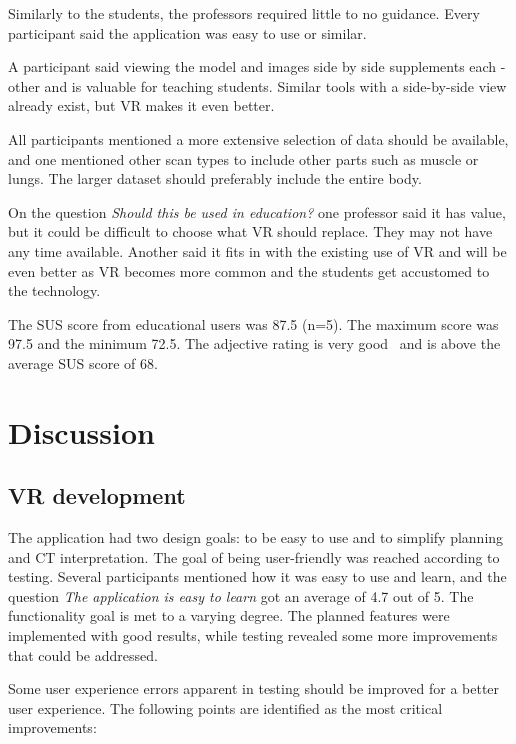 \documentclass[a4paper]{report}
\begin{document}
Similarly to the students, the professors required little to no guidance. Every participant said the application was easy to use or similar.

A participant said viewing the model and images side by side supplements each -other and is valuable for teaching students. Similar tools with a side-by-side view already exist, but VR makes it even better.

All participants mentioned a more extensive selection of data should be available, and one mentioned other scan types to include other parts such as muscle or lungs. The larger dataset should preferably include the entire body.


On the question \emph{Should this be used in education?} one professor said it has value, but it could be difficult to choose what VR should replace. They may not have any time available. Another said it fits in with the existing use of VR and will be even better as VR becomes more common and the students get accustomed to the technology.

The SUS score from educational users was 87.5 (n=5). The maximum score was 97.5 and the minimum 72.5. The adjective rating is very good~\cite{bangor_empirical_2008} and is above the average SUS score of 68.





\section{Discussion}

\subsection{VR development}

The application had two design goals: to be easy to use and to simplify planning and CT interpretation.
The goal of being user-friendly was reached according to testing. Several participants mentioned how it was easy to use and learn, and the question \emph{The application is easy to learn} got an average of 4.7 out of 5.
The functionality goal is met to a varying degree. The planned features were implemented with good results, while testing revealed some more improvements that could be addressed.

Some user experience errors apparent in testing should be improved for a better user experience. The following points are identified as the most critical improvements:
\end{document}
